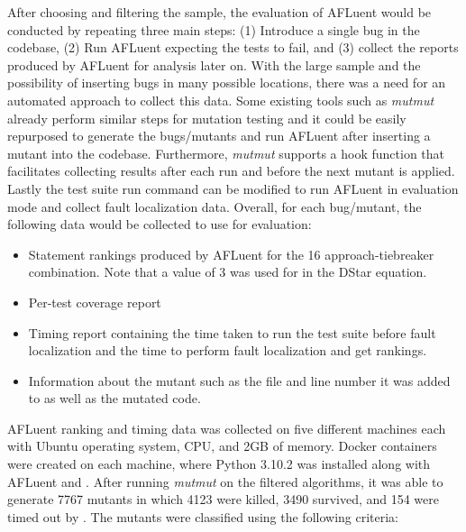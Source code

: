 After choosing and filtering the sample, the evaluation of AFLuent would be
conducted by repeating three main steps: (1) Introduce a single bug in the codebase,
(2) Run AFLuent expecting the tests to fail, and (3) collect the reports
produced by AFLuent for analysis later on. With the large sample and the
possibility of inserting bugs in many possible locations, there was a need for
an automated approach to collect this data. Some existing tools such as
\emph{mutmut} \cite{mutmut} already perform similar steps for
mutation testing and it could be easily repurposed to generate the bugs/mutants and run
AFLuent after inserting a mutant into the codebase. Furthermore, \emph{mutmut}
supports a hook function that facilitates collecting results after each run and
before the next mutant is applied. Lastly the test suite run command can be
modified to run AFLuent in evaluation mode and collect fault localization data.
Overall, for each bug/mutant, the following data would be collected to use for
evaluation:
\begin{itemize}
    \item Statement rankings produced by AFLuent for the 16
    approach-tiebreaker combination. Note that a value of 3 was used for \code{*} in
    the DStar equation.
    \item Per-test coverage report
    \item Timing report containing the time taken to run the test suite before
    fault localization and the time to perform fault localization and get
    rankings.
    \item Information about the mutant such as the file and line number it was
    added to as well as the mutated code.
\end{itemize}

AFLuent ranking and timing data was collected on five different machines each with
Ubuntu operating system,  CPU, and 2GB of memory. Docker containers were created
on each machine, where Python 3.10.2 was installed along with AFLuent and
. After running \emph{mutmut} on the filtered algorithms, it was able
to generate 7767 mutants in which 4123 were killed, 3490 survived, and 154 were
timed out by . The mutants were classified using the following criteria:

